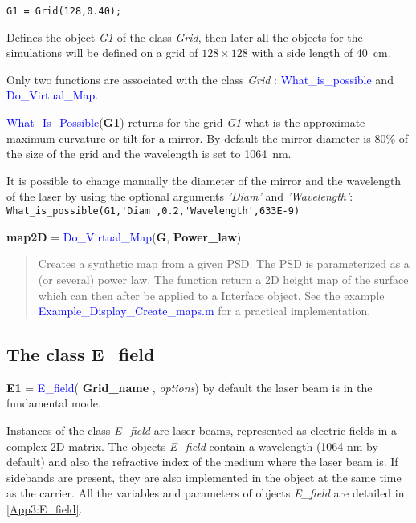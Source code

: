 \begin{verbatim}
G1 = Grid(128,0.40);
\end{verbatim}

Defines the object \textsl{G1} of the class \textsl{Grid}, then later all the objects for the simulations will be defined on a grid of $128 \times 128$ with a side length of 40~cm.

Only two functions are associated with the class \textsl{Grid} : \textcolor{blue}{What\_is\_possible} and \textcolor{blue}{Do\_Virtual\_Map}.

\textcolor{blue}{What\_Is\_Possible}(\textbf{G1}) returns for the grid \textsl{G1} what is the approximate maximum curvature or tilt for a mirror. By default the mirror diameter is 80\% of the size of the grid and the wavelength is set to 1064~nm.

It is possible to change manually the diameter of the mirror and the wavelength of the laser by using the optional arguments \emph{'Diam'} and \emph{'Wavelength'}: \verb? What_is_possible(G1,'Diam',0.2,'Wavelength',633E-9) ?

\noindent \textbf{map2D} = \textcolor{blue}{Do\_Virtual\_Map}(\textbf{G}, \textbf{Power\_law})
\vspace*{-0.2cm}
\begin{quote}
Creates a synthetic map from a given PSD. The PSD is parameterized as a (or several) power law. The function return a 2D height map of the surface which can then after be applied to a Interface object. See the example \textcolor{blue}{Example\_Display\_Create\_maps.m} for a practical implementation.
\end{quote}


\subsection{The class E\_field}
\textbf{E1} = \textcolor{blue}{E\_field}( \textbf{Grid\_name} , \emph{options}) by default the laser beam is in the fundamental mode.

Instances of the class \textsl{E\_field} are laser beams, represented as electric fields in a complex 2D matrix. The objects \textsl{E\_field} contain a wavelength (1064 nm by default) and also the refractive index of the medium where the laser beam is. If sidebands are present, they are also implemented in the object at the same time as the carrier. All the variables and parameters of objects \textsl{E\_field} are detailed in \ref{App3:E_field}.

